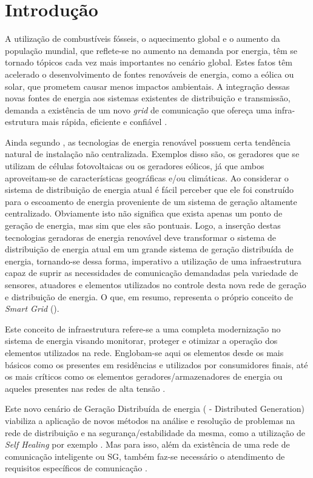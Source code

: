 \chapter{Introdução}
\label{cap_introducao}
A utilização de combustíveis fósseis, o aquecimento global e o aumento da população mundial, que reflete-se no aumento na demanda por energia, têm se tornado tópicos cada vez mais importantes no cenário global. Estes fatos têm acelerado o desenvolvimento de fontes renováveis de energia, como a eólica ou solar, que prometem causar menos impactos ambientais. A integração dessas novas fontes de energia aos sistemas existentes de distribuição e transmissão, demanda a existência de um novo \emph{grid} de comunicação que ofereça uma infra-estrutura mais rápida, eficiente e confiável \cite{Art-Gungor2013}.

Ainda segundo \cite{Art-Gungor2013}, as tecnologias de energia renovável possuem certa tendência natural de instalação não centralizada. Exemplos disso são, os geradores que se utilizam de células fotovoltaicas ou os geradores eólicos, já que ambos aproveitam-se de características geográficas e/ou climáticas. Ao considerar o sistema de distribuição de energia atual é fácil perceber que ele foi construído para o escoamento de energia proveniente de um sistema de geração altamente centralizado. Obviamente isto não significa que exista apenas um ponto de geração de energia, mas sim que eles são pontuais. Logo, a inserção destas tecnologias geradoras de energia renovável deve transformar o sistema de distribuição de energia atual em um grande sistema de geração distribuída de energia, tornando-se dessa forma, imperativo a utilização de uma infraestrutura capaz de suprir as necessidades de comunicação demandadas pela variedade de sensores, atuadores e elementos utilizados no controle desta nova rede de geração e distribuição de energia. O que, em resumo, representa o próprio conceito de \emph{Smart Grid} ().

Este conceito de infraestrutura refere-se a uma completa modernização no sistema de energia visando monitorar, proteger e otimizar a operação dos elementos utilizados na rede. Englobam-se aqui os elementos desde os mais básicos como os presentes em residências e utilizados por consumidores finais, até os mais críticos como os elementos geradores/armazenadores de energia ou aqueles presentes nas redes de alta tensão \cite{Conf-Sood2009}.

Este novo cenário de Geração Distribuída de energia ( - Distributed Generation) viabiliza a aplicação de novos métodos na análise e resolução de problemas na rede de distribuição e na segurança/estabilidade da mesma, como a utilização de \emph{Self Healing} por exemplo \cite{Art-Amin2006}. Mas para isso, além da existência de uma rede de comunicação inteligente ou SG, também faz-se necessário o atendimento de requisitos específicos de comunicação \cite{Conf-Sood2009}.

